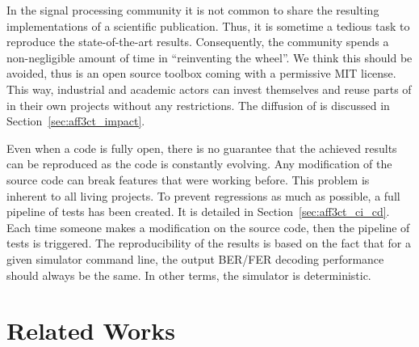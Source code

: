In the signal processing community it is not common to share the resulting
implementations of a scientific publication. Thus, it is sometime a tedious task
to reproduce the state-of-the-art results. Consequently, the community spends a
non-negligible amount of time in ``reinventing the wheel''. We think this should
be avoided, thus \AFFECT is an open source toolbox coming with a permissive MIT
license. This way, industrial and academic actors can invest themselves and
reuse parts of \AFFECT in their own projects without any restrictions. The
diffusion of \AFFECT is discussed in Section~\ref{sec:aff3ct_impact}.

Even when a code is fully open, there is no guarantee that the achieved results
can be reproduced as the code is constantly evolving. Any modification of the
source code can break features that were working before. This problem is
inherent to all living projects. To prevent regressions as much as possible, a
full pipeline of tests has been created. It is detailed in
Section~\ref{sec:aff3ct_ci_cd}. Each time someone makes a modification on the
\AFFECT source code, then the pipeline of tests is triggered. The
reproducibility of the results is based on the fact that for a given \AFFECT
simulator command line, the output BER/FER decoding performance should always be
the same. In other terms, the \AFFECT simulator is deterministic.

\section{Related Works}
\label{sec:aff3ct_related_works}

